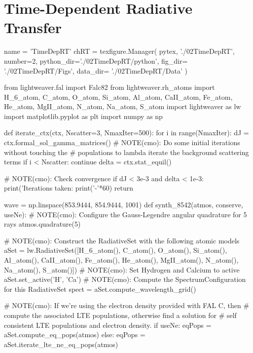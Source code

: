 \chapter{Time-Dependent Radiative Transfer}\label{Chap:TimeDepRt}

\begin{pycode}[TimeDepRT]
name = 'TimeDepRT'
chRT = texfigure.Manager(
    pytex,
    './02TimeDepRT',
    number=2,
    python_dir='./02TimeDepRT/python',
    fig_dir=   './02TimeDepRT/Figs',
    data_dir=  './02TimeDepRT/Data'
)
\end{pycode}

\begin{pycode}[TimeDepRT]
from lightweaver.fal import Falc82
from lightweaver.rh_atoms import H_6_atom, C_atom, O_atom, Si_atom, Al_atom, CaII_atom, Fe_atom, He_atom, MgII_atom, N_atom, Na_atom, S_atom
import lightweaver as lw
import matplotlib.pyplot as plt
import numpy as np

def iterate_ctx(ctx, Nscatter=3, NmaxIter=500):
    for i in range(NmaxIter):
        dJ = ctx.formal_sol_gamma_matrices()
        # NOTE(cmo): Do some initial iterations without touching the
        # populations to lambda iterate the background scattering terms
        if i < Nscatter:
            continue
        delta = ctx.stat_equil()

        # NOTE(cmo): Check convergence
        if dJ < 3e-3 and delta < 1e-3:
            print('Iterations taken: %
            print('-'*60)
            return

wave = np.linspace(853.9444, 854.9444, 1001)
def synth_8542(atmos, conserve, useNe):
    # NOTE(cmo): Configure the Gauss-Legendre angular quadrature for 5 rays
    atmos.quadrature(5)

    # NOTE(cmo): Construct the RadiativeSet with the following atomic models
    aSet = lw.RadiativeSet([H_6_atom(), C_atom(), O_atom(), Si_atom(), Al_atom(), CaII_atom(),
                            Fe_atom(), He_atom(), MgII_atom(), N_atom(), Na_atom(), S_atom()])
    # NOTE(cmo): Set Hydrogen and Calcium to active
    aSet.set_active('H', 'Ca')
    # NOTE(cmo): Compute the SpectrumConfiguration for this RadiativeSet
    spect = aSet.compute_wavelength_grid()

    # NOTE(cmo): If we're using the electron density provided with FAL C, then
    # compute the associated LTE populations, otherwise find a solution for
    # self consistent LTE populations and electron density.
    if useNe:
        eqPops = aSet.compute_eq_pops(atmos)
    else:
        eqPops = aSet.iterate_lte_ne_eq_pops(atmos)


\end{pycode}
